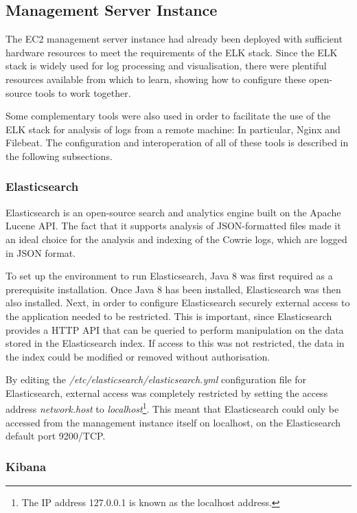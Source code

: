 \subsection{Management Server Instance}
The EC2 management server instance had already been deployed with sufficient hardware resources to meet the requirements of the ELK stack. Since the ELK stack is widely used for log processing and visualisation, there were plentiful resources available from which to learn, showing how to configure these open-source tools to work together.

Some complementary tools were also used in order to facilitate the use of the ELK stack for analysis of logs from a remote machine: In particular, Nginx and Filebeat. The configuration and interoperation of all of these tools is described in the following subsections.

	\subsubsection{Elasticsearch}
    Elasticsearch is an open-source search and analytics engine built on the Apache Lucene API. The fact that it supports analysis of JSON-formatted files made it an ideal choice for the analysis and indexing of the Cowrie logs, which are logged in JSON format.
    
    To set up the environment to run Elasticsearch, Java 8 was first required as a prerequisite installation. Once Java 8 has been installed, Elasticsearch was then also installed. Next, in order to configure Elasticsearch securely external access to the application needed to be restricted. This is important, since Elasticsearch provides a HTTP API that can be queried to perform manipulation on the data stored in the Elasticsearch index. If access to this was not restricted, the data in the index could be modified or removed without authorisation.
    
    By editing the \textit{/etc/elasticsearch/elasticsearch.yml} configuration file for Elasticsearch, external access was completely restricted by setting the access address \textit{network.host} to \textit{localhost}\footnote{The IP address 127.0.0.1 is known as the localhost address.}. This meant that Elasticsearch could only be accessed from the management instance itself on localhost, on the Elasticsearch default port 9200/TCP. 
    
	\subsubsection{Kibana}
    
